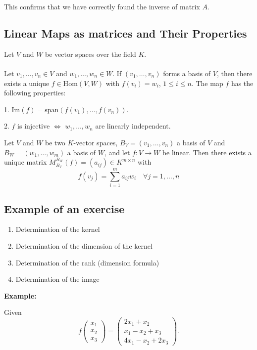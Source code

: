 This confirms that we have correctly found the inverse of matrix \(A\).

\subsection{Linear Maps as matrices and Their Properties}

Let \(V\) and \(W\) be vector spaces over the field \(K\).
\\\\
Let \(v_1, \dots, v_n \in V\) and \(w_1, \dots, w_n \in W\). If \((v_1, \dots, v_n)\) forms a basis of \(V\), then there exists a unique \(f \in \text{Hom}(V, W)\) with \(f(v_i) = w_i\), \(1 \leq i \leq n\). The map \(f\) has the following properties:

1.  \(\text{Im}(f) = \text{span}(f(v_1), \dots, f(v_n))\).

2.  \(f\) is injective \(\Leftrightarrow\) \(w_1, \dots, w_n\) are linearly independent.

 Let \(V\) and \(W\) be two \(K\)-vector spaces, \(B_V = (v_1, \dots, v_n)\) a basis of \(V\) and \(B_W = (w_1, \dots, w_m)\) a basis of \(W\), and let \(f : V \rightarrow W\) be linear. Then there exists a unique matrix \(M_{B_V}^{B_W}(f) = (a_{ij}) \in K^{m \times n}\) with
\[
f(v_j) = \sum_{i=1}^{m} a_{ij}w_i \quad \forall j = 1, \dots, n
\]

\subsection{Example of an exercise}

\begin{enumerate}
    \item Determination of the kernel
    \item Determination of the dimension of the kernel
    \item Determination of the rank (dimension formula)
    \item Determination of the image
\end{enumerate}


\textbf{Example:} 

Given
\[
f\begin{pmatrix}
x_1 \\
x_2 \\
x_3
\end{pmatrix} =
\begin{pmatrix}
2x_1 + x_2 \\
x_1 - x_2 + x_3 \\
4x_1 - x_2 + 2x_3
\end{pmatrix} .
\]

